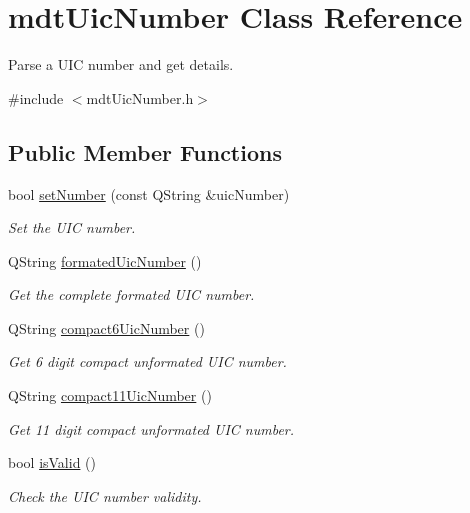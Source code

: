 \hypertarget{classmdt_uic_number}{
\section{mdtUicNumber Class Reference}
\label{classmdt_uic_number}
}


Parse a UIC number and get details.  




{\ttfamily \#include $<$mdtUicNumber.h$>$}

\subsection*{Public Member Functions}
\begin{DoxyCompactItemize}
\item 
bool \hyperlink{classmdt_uic_number_aadf50072784344824c696da7cff5b445}{setNumber} (const QString \&uicNumber)
\begin{DoxyCompactList}\small\item\em Set the UIC number. \end{DoxyCompactList}\item 
QString \hyperlink{classmdt_uic_number_a0eda9b614e91b32c0d99bc016d906eae}{formatedUicNumber} ()
\begin{DoxyCompactList}\small\item\em Get the complete formated UIC number. \end{DoxyCompactList}\item 
QString \hyperlink{classmdt_uic_number_ac213145f98f8373d3300f4b3d46881cc}{compact6UicNumber} ()
\begin{DoxyCompactList}\small\item\em Get 6 digit compact unformated UIC number. \end{DoxyCompactList}\item 
QString \hyperlink{classmdt_uic_number_a1923dbc9f382433d3d669b32aac75888}{compact11UicNumber} ()
\begin{DoxyCompactList}\small\item\em Get 11 digit compact unformated UIC number. \end{DoxyCompactList}\item 
bool \hyperlink{classmdt_uic_number_aac3c9e1adb6f9646216b4327645a621a}{isValid} ()
\begin{DoxyCompactList}\small\item\em Check the UIC number validity. \end{DoxyCompactList}\item 

\end{DoxyCompactItemize}
